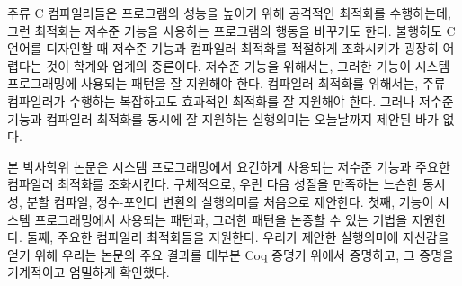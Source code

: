 \begin{abstractalt}
  주류 C 컴파일러들은 프로그램의 성능을 높이기 위해 공격적인 최적화를 수행하는데, 그런 최적화는
  저수준 기능을 사용하는 프로그램의 행동을 바꾸기도 한다.  불행히도 C 언어를 디자인할 때 저수준
  기능과 컴파일러 최적화를 적절하게 조화시키가 굉장히 어렵다는 것이 학계와 업계의 중론이다.  저수준
  기능을 위해서는, 그러한 기능이 시스템 프로그래밍에 사용되는 패턴을 잘 지원해야 한다.  컴파일러
  최적화를 위해서는, 주류 컴파일러가 수행하는 복잡하고도 효과적인 최적화를 잘 지원해야 한다.  그러나
  저수준 기능과 컴파일러 최적화를 동시에 잘 지원하는 실행의미는 오늘날까지 제안된 바가 없다.

  본 박사학위 논문은 시스템 프로그래밍에서 요긴하게 사용되는 저수준 기능과 주요한 컴파일러 최적화를
  조화시킨다.  구체적으로, 우린 다음 성질을 만족하는 느슨한 동시성, 분할 컴파일, 정수-포인터 변환의
  실행의미를 처음으로 제안한다.  첫째, 기능이 시스템 프로그래밍에서 사용되는 패턴과, 그러한 패턴을
  논증할 수 있는 기법을 지원한다.  둘째, 주요한 컴파일러 최적화들을 지원한다.  우리가 제안한
  실행의미에 자신감을 얻기 위해 우리는 논문의 주요 결과를 대부분 Coq 증명기 위에서 증명하고, 그
  증명을 기계적이고 엄밀하게 확인했다.
\end{abstractalt}

